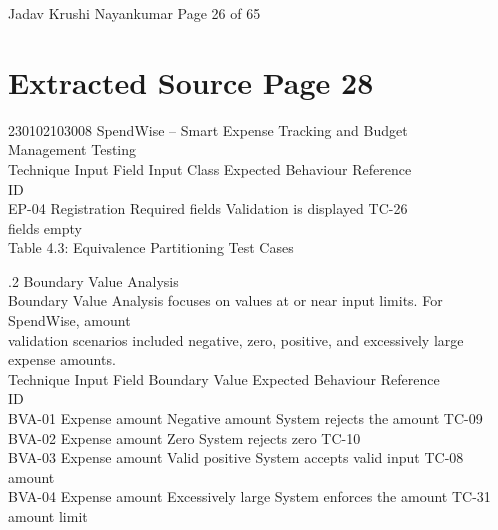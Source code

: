 \documentclass[12pt,a4paper]{report}
\begin{document}
\smallskip

\smallskip

\smallskip

\smallskip
Jadav Krushi Nayankumar                                                           Page 26 of 65\\ 

\clearpage
\section*{Extracted Source Page 28}
230102103008                               SpendWise – Smart Expense Tracking and Budget\\ 
Management Testing\\ 

\smallskip
Technique Input Field             Input Class             Expected Behaviour            Reference\\ 
ID\\ 
EP-04       Registration          Required        fields Validation is displayed        TC-26\\ 
fields                empty\\ 

\smallskip
Table 4.3: Equivalence Partitioning Test Cases\\ 

\smallskip

\smallskip

.2 Boundary Value Analysis\\ 

\smallskip
Boundary Value Analysis focuses on values at or near input limits. For SpendWise, amount\\ 
validation scenarios included negative, zero, positive, and excessively large expense amounts.\\ 

\smallskip
Technique Input Field             Boundary Value Expected Behaviour                     Reference\\ 
ID\\ 
BVA-01      Expense amount        Negative amount         System rejects the amount     TC-09\\ 
BVA-02      Expense amount        Zero                    System rejects zero           TC-10\\ 
BVA-03      Expense amount        Valid         positive System accepts valid input     TC-08\\ 
amount\\ 
BVA-04      Expense amount        Excessively     large System enforces the amount TC-31\\ 
amount                  limit\\ 
\end{document}
